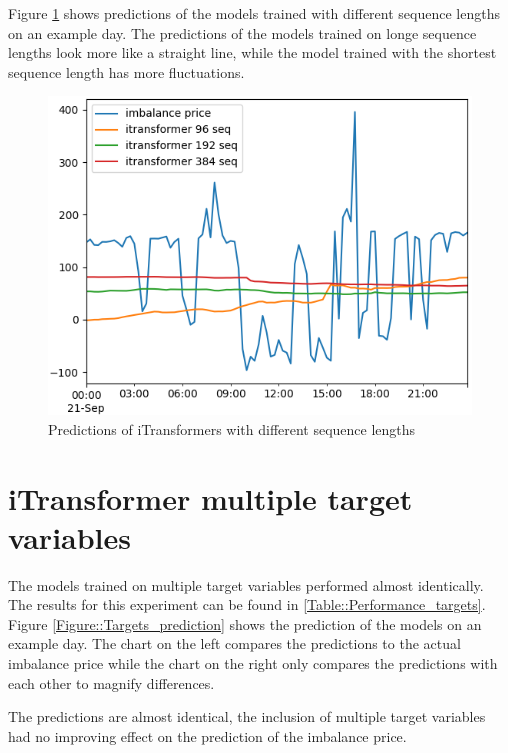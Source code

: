 \documentclass[class=scrbook, crop=false]{standalone}
\begin{document}
Figure \ref{Result::iTransformer_sequence_length} shows predictions of the models trained with different sequence lengths on an example day.
The predictions of the models trained on longe sequence lengths look more like a straight line, while the model trained with the shortest sequence length has more fluctuations.

\begin{figure}
  \centering
  \includegraphics[width=.8\linewidth]{../images/results/itransformer_sequence_length_results.png}
  \caption{Predictions of iTransformers with different sequence lengths}
\label{Result::iTransformer_sequence_length}
\end{figure}

\section{iTransformer multiple target variables}

The models trained on multiple target variables performed almost identically.
The results for this experiment can be found in \ref{Table::Performance_targets}.
Figure \ref{Figure::Targets_prediction} shows the prediction of the models on an example day.
The chart on the left compares the predictions to the actual imbalance price while the chart on the right only compares the predictions with each other to magnify differences.

The predictions are almost identical, the inclusion of multiple target variables had no improving effect on the prediction of the imbalance price.
\end{document}

